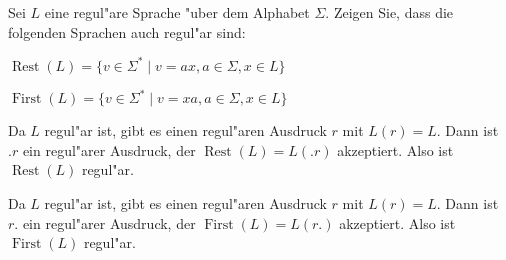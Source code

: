 Sei $L$ eine regul"are Sprache "uber dem Alphabet $\Sigma$.
Zeigen Sie, dass die folgenden Sprachen auch regul"ar sind:
\begin{teilaufgaben}
\item $\operatorname{Rest}(L)=\{v \in\Sigma^*\;|\; v=ax, a\in\Sigma, x\in L\}$
\item $\operatorname{First}(L)=\{v \in\Sigma^*\;|\; v=xa, a\in\Sigma, x\in L\}$
\end{teilaufgaben}

\begin{loesung}
\begin{teilaufgaben}
\item Da $L$ regul"ar ist, gibt es einen regul"aren Ausdruck $r$ mit
$L(r)=L$. Dann ist $.r$ ein regul"arer Ausdruck, der
$\operatorname{Rest}(L)=L(.r)$ akzeptiert.
Also ist
$\operatorname{Rest}(L)$ regul"ar.
\item Da $L$ regul"ar ist, gibt es einen regul"aren Ausdruck $r$ mit
$L(r)=L$. Dann ist $r.$ ein regul"arer Ausdruck, der
$\operatorname{First}(L)=L(r.)$ akzeptiert. Also ist
$\operatorname{First}(L)$ regul"ar.
\qedhere
\end{teilaufgaben}
\end{loesung}

